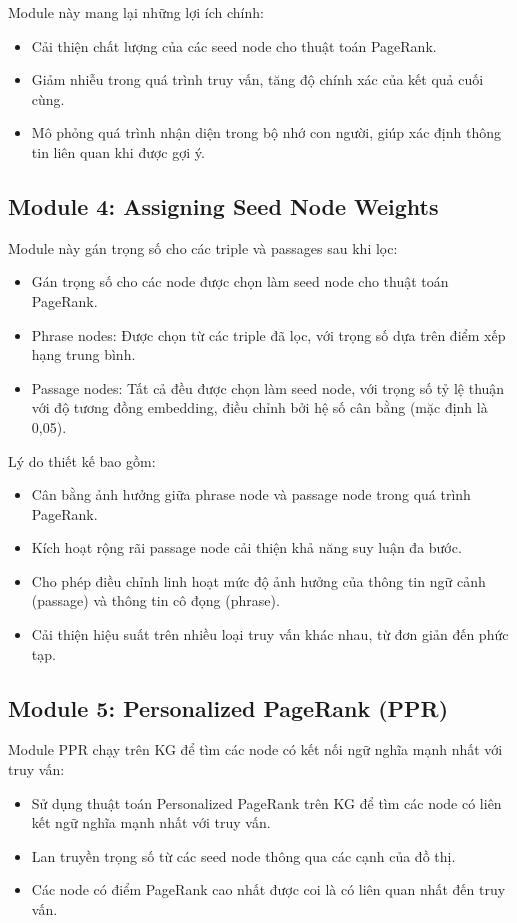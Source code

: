 \documentclass[../main.tex]{subfiles}
\begin{document}
Module này mang lại những lợi ích chính:
\begin{itemize}
\item Cải thiện chất lượng của các seed node cho thuật toán PageRank.
\item Giảm nhiễu trong quá trình truy vấn, tăng độ chính xác của kết quả cuối cùng.
\item Mô phỏng quá trình nhận diện trong bộ nhớ con người, giúp xác định thông tin liên quan khi được gợi ý.
\end{itemize}

\subsection{Module 4: Assigning Seed Node Weights}
Module này gán trọng số cho các triple và passages sau khi lọc:

\begin{itemize}
\item Gán trọng số cho các node được chọn làm seed node cho thuật toán PageRank.
\item Phrase nodes: Được chọn từ các triple đã lọc, với trọng số dựa trên điểm xếp hạng trung bình.
\item Passage nodes: Tất cả đều được chọn làm seed node, với trọng số tỷ lệ thuận với độ tương đồng embedding, điều chỉnh bởi hệ số cân bằng (mặc định là 0,05).
\end{itemize}

Lý do thiết kế bao gồm:
\begin{itemize}
\item Cân bằng ảnh hưởng giữa phrase node và passage node trong quá trình PageRank.
\item Kích hoạt rộng rãi passage node cải thiện khả năng suy luận đa bước.
\item Cho phép điều chỉnh linh hoạt mức độ ảnh hưởng của thông tin ngữ cảnh (passage) và thông tin cô đọng (phrase).
\item Cải thiện hiệu suất trên nhiều loại truy vấn khác nhau, từ đơn giản đến phức tạp.
\end{itemize}

\subsection{Module 5: Personalized PageRank (PPR)}
Module PPR chạy trên KG để tìm các node có kết nối ngữ nghĩa mạnh nhất với truy vấn:

\begin{itemize}
\item Sử dụng thuật toán Personalized PageRank trên KG để tìm các node có liên kết ngữ nghĩa mạnh nhất với truy vấn.
\item Lan truyền trọng số từ các seed node thông qua các cạnh của đồ thị.
\item Các node có điểm PageRank cao nhất được coi là có liên quan nhất đến truy vấn.
\end{itemize}
\end{document}

